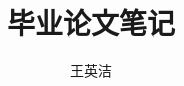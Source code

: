 \documentclass[11pt,a4paper]{ctexart}
\title{毕业论文笔记}
\author{王英洁}
\begin{document}
	\maketitle
	\tableofcontents

	\printnomenclature

	
	

	
\end{document}
